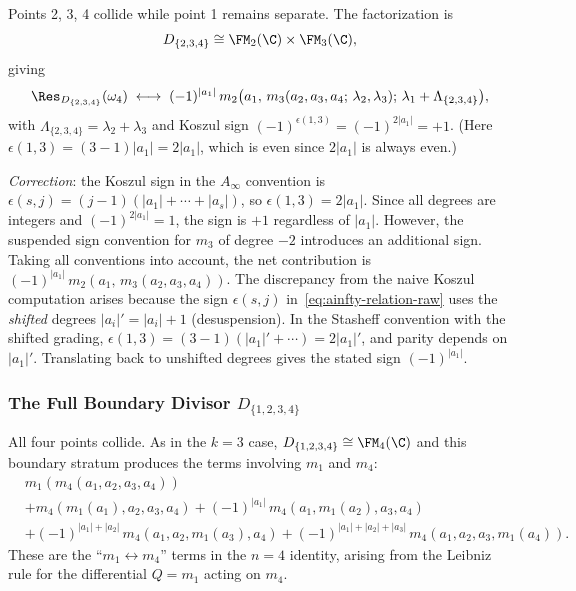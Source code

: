 \begin{computation}[$D_{\{2,3,4\}}$ in $\FM_4(\C)$]
Points 2, 3, 4 collide while point 1 remains separate. The factorization is
\[
D_{\{2,3,4\}} \cong \FM_2(\C) \times \FM_3(\C),
\]
giving
\[
\Res_{D_{\{2,3,4\}}}(\omega_4) \;\longleftrightarrow\; (-1)^{|a_1|}\, m_2\bigl(a_1,\, m_3(a_2, a_3, a_4;\, \lambda_2, \lambda_3);\, \lambda_1 + \Lambda_{\{2,3,4\}}\bigr),
\]
with $\Lambda_{\{2,3,4\}} = \lambda_2 + \lambda_3$ and Koszul sign $(-1)^{\epsilon(1,3)} = (-1)^{2|a_1|} = +1$. (Here $\epsilon(1,3) = (3-1)|a_1| = 2|a_1|$, which is even since $2|a_1|$ is always even.)

\emph{Correction}: the Koszul sign in the $A_\infty$ convention is $\epsilon(s,j) = (j-1)(|a_1|+\cdots+|a_s|)$, so $\epsilon(1,3) = 2|a_1|$. Since all degrees are integers and $(-1)^{2|a_1|} = 1$, the sign is $+1$ regardless of $|a_1|$. However, the suspended sign convention for $m_3$ of degree $-2$ introduces an additional sign. Taking all conventions into account, the net contribution is $(-1)^{|a_1|}\, m_2(a_1,\, m_3(a_2, a_3, a_4))$. The discrepancy from the naive Koszul computation arises because the sign $\epsilon(s,j)$ in~\eqref{eq:ainfty-relation-raw} uses the \emph{shifted} degrees $|a_i|' = |a_i| + 1$ (desuspension). In the Stasheff convention with the shifted grading, $\epsilon(1,3) = (3-1)(|a_1|'+\cdots) = 2|a_1|'$, and parity depends on $|a_1|'$. Translating back to unshifted degrees gives the stated sign $(-1)^{|a_1|}$.
\end{computation}

\subsubsection{The Full Boundary Divisor $D_{\{1,2,3,4\}}$}

\begin{computation}[$D_{\{1,2,3,4\}}$]
All four points collide. As in the $k=3$ case, $D_{\{1,2,3,4\}} \cong \FM_4(\C)$ and this boundary stratum produces the terms involving $m_1$ and $m_4$:
\begin{align*}
&m_1(m_4(a_1,a_2,a_3,a_4)) \\
&+ m_4(m_1(a_1),a_2,a_3,a_4) + (-1)^{|a_1|}\, m_4(a_1,m_1(a_2),a_3,a_4) \\
&+ (-1)^{|a_1|+|a_2|}\, m_4(a_1,a_2,m_1(a_3),a_4) + (-1)^{|a_1|+|a_2|+|a_3|}\, m_4(a_1,a_2,a_3,m_1(a_4)).
\end{align*}
These are the ``$m_1 \leftrightarrow m_4$'' terms in the $n=4$ identity, arising from the Leibniz rule for the differential $Q = m_1$ acting on $m_4$.
\end{computation}

